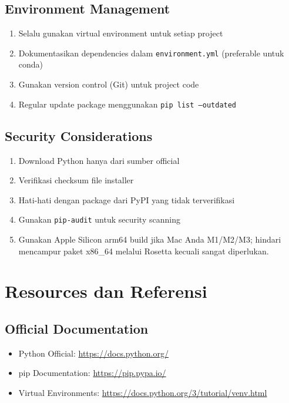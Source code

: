 \subsection{Environment Management}
\begin{enumerate}
    \item Selalu gunakan virtual environment untuk setiap project
    \item Dokumentasikan dependencies dalam \texttt{environment.yml} (preferable untuk conda)
    \item Gunakan version control (Git) untuk project code
    \item Regular update package menggunakan \texttt{pip list --outdated}
\end{enumerate}

\subsection{Security Considerations}
\begin{enumerate}
    \item Download Python hanya dari sumber official
    \item Verifikasi checksum file installer
    \item Hati-hati dengan package dari PyPI yang tidak terverifikasi
    \item Gunakan \texttt{pip-audit} untuk security scanning
    \item Gunakan Apple Silicon arm64 build jika Mac Anda M1/M2/M3; hindari mencampur paket x86\_64 melalui Rosetta kecuali sangat diperlukan.
\end{enumerate}

\section{Resources dan Referensi}

\subsection{Official Documentation}
\begin{itemize}
    \item Python Official: \url{https://docs.python.org/}
    \item pip Documentation: \url{https://pip.pypa.io/}
    \item Virtual Environments: \url{https://docs.python.org/3/tutorial/venv.html}
\end{itemize}

